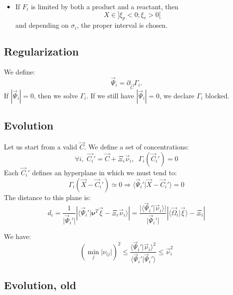 \documentclass[aps,12pt]{revtex4}
\begin{document}
\begin{itemize}
\begin{itemize}
	\item If $F_i$ is limited by both a product and a reactant, then $$X\in\rbrack \xi_p < 0 ; \xi_r > 0 \lbrack$$
	and depending on $\sigma_i$, the proper interval is chosen.
	\end{itemize}
	
\end{itemize}



 \subsection{Regularization}
We define:
\begin{equation}
\vec{\Psi}_i = \partial_{\vec{C}} \Gamma_i.
\end{equation}
If $|\vec{\Psi}_i|=0$, then we solve $\Gamma_i$. If we still have $|\vec{\Psi}_i|=0$, we declare $\Gamma_i$ blocked.

\subsection{Evolution}
Let us start from a valid $\vec{C}$.
We define a set of concentrations:
\begin{equation}
	\forall i,\;\vec{C_i}' = \vec{C} + \Xi_i \vec{\nu}_i,\;\;\Gamma_i(\vec{C}_i') = 0
\end{equation}
Each $\vec{C}_i'$ defines an hyperplane in which we must tend to:
\begin{equation}
	\Gamma_i(\vec{X}-\vec{C}_i') \simeq 0 \Rightarrow \langle\vec{\Psi}_i'\vert \vec{X}-\vec{C}_i' \rangle = 0
\end{equation}
The distance to this plane is:
\begin{equation}
	d_i = \dfrac{1}{\vert \vec{\Psi}_i' \vert}
	\left\vert \langle \vec{\Psi}_i' \vert \bm{\nu}^T \vec{\xi} - \Xi_i \vec{\nu}_i \rangle \right\vert
	=   \dfrac{ \vert\langle \vec{\Psi}_i' \vert \vec{\nu}_i \rangle \vert }{  \vert \vec{\Psi}_i' \vert } 
	\left\vert \langle \vec{\Omega}_i \vert \vec{\xi}\rangle - \Xi_i \right\vert
\end{equation}

We have:
\begin{equation}
	\left(\min_j \vert\nu_{ij}\vert\right)^2 \leq \dfrac{  \langle \vec{\Psi}_i' \vert \vec{\nu}_i \rangle ^2 }{  \langle \vec{\Psi}_i' \vert \vec{\Psi}_i' \rangle } 
	\leq \vec{\nu}_i^2
\end{equation}


\subsection{Evolution, old}
\end{document}
